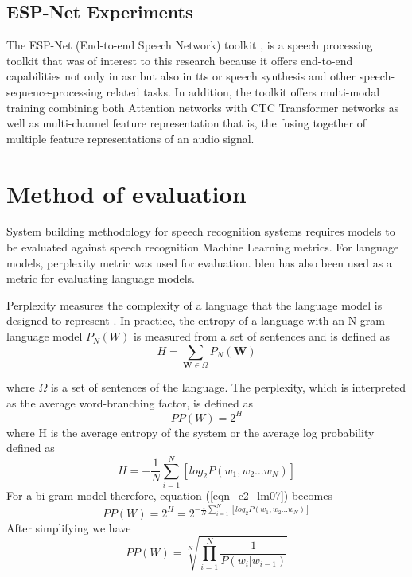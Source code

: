 \subsection{ESP-Net Experiments}\label{c3sec_espnet}
The ESP-Net (End-to-end Speech Network) toolkit \citep{watanabe2018espnet}, is a speech processing toolkit that was of interest to this research because it offers end-to-end capabilities not only in \acrfull{asr} but also in \acrfull{tts} or speech synthesis and other speech-sequence-processing related tasks.  In addition, the toolkit offers multi-modal training combining both Attention networks \cite{vaswani2017attention} with CTC Transformer networks as well as multi-channel feature representation that is, the fusing together of multiple feature representations of an audio signal.

\section{Method of evaluation}
System building methodology \citep{nunamaker1990systems} for speech recognition systems requires models to be evaluated against speech recognition Machine Learning metrics.  For language models, perplexity metric was used for evaluation.  \acrfull{bleu}\citep{papineni2002bleu} has also been used as a metric for evaluating language models.

Perplexity measures the complexity of a language that the language model is designed to represent \citep{1976jelinekcontinuous}. In practice, the entropy of a language with an N-gram language model $P_N(W)$ is measured from a set of sentences and is defined as
\begin{equation}H=\sum_{\mathbf{W}\in\Omega}P_N(\mathbf{W})
\label{eqn_c2_lm05}
\end{equation}

where $\Omega$ is a set of sentences of the language. The perplexity, which is interpreted as the average word-branching factor, is defined as
\begin{equation}PP(W)=2^H
\label{eqn_c2_lm06}
\end{equation}
where H is the average entropy of the system or the average log probability defined as
\begin{equation}
H=-\frac{1}{N}\sum_{i=1}^N[log_2P(w_1,w_2\dots w_N)]
\label{eqn_c2_lm07}
\end{equation}
For a bi gram model therefore, equation (\ref{eqn_c2_lm07}) becomes
\begin{equation}
PP(W)=2^H=2^{-\frac{1}{N}\sum_{i=1}^N[log_2P(w_1,w_2\dots w_N)]}
\label{eqn_c2_lm08}
\end{equation}
After simplifying we have
\begin{equation}
PP(W)=\sqrt[N]{\prod_{i=1}^N\frac{1}{P(w_i|w_{i-1})}}
\label{eqn_c2_lm09}
\end{equation}


